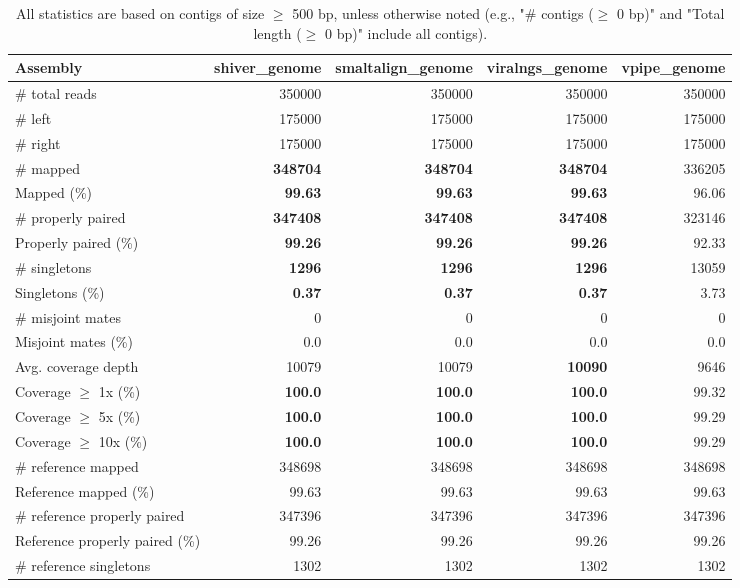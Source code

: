 \documentclass[12pt,a4paper]{article}
\begin{document}
\begin{table}[ht]
\begin{center}
\caption{All statistics are based on contigs of size $\geq$ 500 bp, unless otherwise noted (e.g., "\# contigs ($\geq$ 0 bp)" and "Total length ($\geq$ 0 bp)" include all contigs).}
\begin{tabular}{|l*{4}{|r}|}
\hline
Assembly & shiver\_genome & smaltalign\_genome & viralngs\_genome & vpipe\_genome \\ \hline
\# total reads & 350000 & 350000 & 350000 & 350000 \\ \hline
\# left & 175000 & 175000 & 175000 & 175000 \\ \hline
\# right & 175000 & 175000 & 175000 & 175000 \\ \hline
\# mapped & {\bf 348704} & {\bf 348704} & {\bf 348704} & 336205 \\ \hline
Mapped (\%) & {\bf 99.63} & {\bf 99.63} & {\bf 99.63} & 96.06 \\ \hline
\# properly paired & {\bf 347408} & {\bf 347408} & {\bf 347408} & 323146 \\ \hline
Properly paired (\%) & {\bf 99.26} & {\bf 99.26} & {\bf 99.26} & 92.33 \\ \hline
\# singletons & {\bf 1296} & {\bf 1296} & {\bf 1296} & 13059 \\ \hline
Singletons (\%) & {\bf 0.37} & {\bf 0.37} & {\bf 0.37} & 3.73 \\ \hline
\# misjoint mates & 0 & 0 & 0 & 0 \\ \hline
Misjoint mates (\%) & 0.0 & 0.0 & 0.0 & 0.0 \\ \hline
Avg. coverage depth & 10079 & 10079 & {\bf 10090} & 9646 \\ \hline
Coverage $\geq$ 1x (\%) & {\bf 100.0} & {\bf 100.0} & {\bf 100.0} & 99.32 \\ \hline
Coverage $\geq$ 5x (\%) & {\bf 100.0} & {\bf 100.0} & {\bf 100.0} & 99.29 \\ \hline
Coverage $\geq$ 10x (\%) & {\bf 100.0} & {\bf 100.0} & {\bf 100.0} & 99.29 \\ \hline
\# reference mapped & 348698 & 348698 & 348698 & 348698 \\ \hline
Reference mapped (\%) & 99.63 & 99.63 & 99.63 & 99.63 \\ \hline
\# reference properly paired & 347396 & 347396 & 347396 & 347396 \\ \hline
Reference properly paired (\%) & 99.26 & 99.26 & 99.26 & 99.26 \\ \hline
\# reference singletons & 1302 & 1302 & 1302 & 1302 \\ \hline

\end{tabular}
\end{center}
\end{table}
\end{document}
